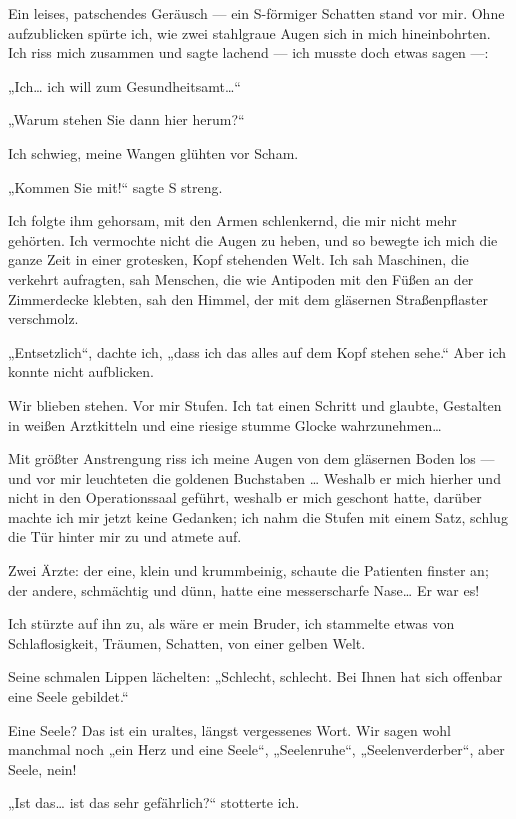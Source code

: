 Ein leises, patschendes Geräusch — ein S-förmiger Schatten stand
vor mir. Ohne aufzublicken spürte ich, wie zwei stahlgraue Augen
sich in mich hineinbohrten. Ich riss mich zusammen und sagte
lachend — ich musste doch etwas sagen —:

„Ich\ldots{} ich will zum Gesundheitsamt\ldots{}“

„Warum stehen Sie dann hier herum?“

Ich schwieg, meine Wangen glühten vor Scham.

„Kommen Sie mit!“ sagte S streng.

Ich folgte ihm gehorsam, mit den Armen schlenkernd, die mir nicht
mehr gehörten. Ich vermochte nicht die Augen zu heben, und so
bewegte ich mich die ganze Zeit
in einer grotesken, Kopf stehenden Welt. Ich sah Maschinen, die
verkehrt aufragten, sah Menschen, die wie Antipoden mit den Füßen
an der Zimmerdecke klebten, sah den Himmel, der mit dem gläsernen
Straßenpflaster verschmolz.

„Entsetzlich“, dachte ich, „dass ich das alles auf dem Kopf stehen
sehe.“ Aber ich konnte nicht aufblicken.

Wir blieben stehen. Vor
mir Stufen. Ich tat einen Schritt und glaubte, Gestalten in weißen
Arztkitteln und eine riesige stumme Glocke wahrzunehmen\ldots{}

Mit
größter Anstrengung riss ich meine Augen von dem gläsernen Boden
los — und vor mir leuchteten die goldenen Buchstaben
\ldots{} Weshalb er mich hierher und nicht in den
Operationssaal geführt, weshalb er mich geschont hatte, darüber
machte ich mir jetzt keine Gedanken; ich nahm die Stufen mit einem
Satz, schlug die Tür hinter mir zu und atmete auf.

Zwei Ärzte: der eine, klein und krummbeinig, schaute die Patienten
finster an; der andere, schmächtig und dünn, hatte eine
messerscharfe Nase\ldots{} Er war es!

Ich stürzte auf ihn zu, als wäre
er mein Bruder, ich stammelte etwas von Schlaflosigkeit, Träumen,
Schatten, von einer gelben Welt.

Seine schmalen Lippen lächelten: „Schlecht, schlecht. Bei Ihnen hat
sich offenbar eine Seele gebildet.“

Eine Seele? Das ist ein
uraltes, längst vergessenes Wort. Wir sagen wohl manchmal noch „ein
Herz und eine Seele“, „Seelenruhe“, „Seelenverderber“, aber Seele,
nein!

„Ist das\ldots{} ist das sehr gefährlich?“ stotterte ich.

